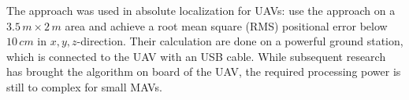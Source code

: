 The approach was used in absolute localization for UAVs: \citet{blosch2010vision} use the approach on a $3.5\,m \times 2\,m$ area and achieve a root mean square (RMS) positional error below $10\,cm$ in $x,y,z$-direction. Their calculation are done on a powerful ground station, which is connected to the UAV with an USB cable. While subsequent research has brought the algorithm on board of the UAV, the required processing power is still to complex for small MAVs.  